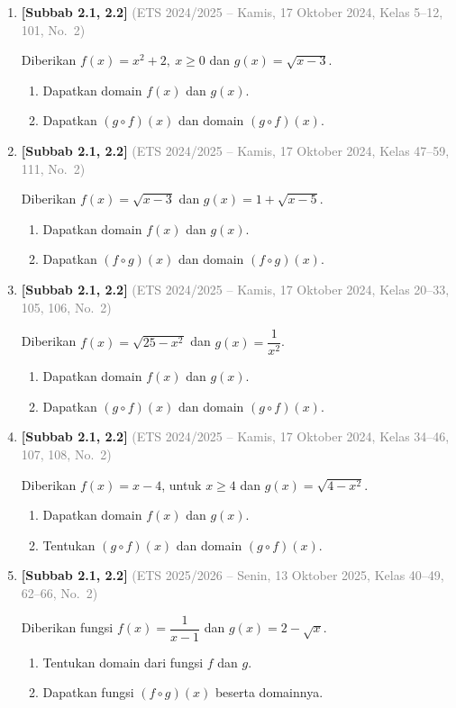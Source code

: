 \documentclass[10pt,openany,a4paper]{article}
\theoremstyle{definition}
\theoremstyle{definition}
\theoremstyle{plain}
\begin{document}
\begin{enumerate}
    \item \textbf{[Subbab 2.1, 2.2]} {\footnotesize\textcolor{gray}{(ETS 2024/2025 -- Kamis, 17 Oktober 2024, Kelas 5--12, 101, No.~2)}}\par
    Diberikan $f(x)=x^2+2,\ x\geq 0$ dan $g(x)=\sqrt{x-3}$.
    \begin{enumerate}
        \item Dapatkan domain $f(x)$ dan $g(x)$.
        \item Dapatkan $(g\circ f)(x)$ dan domain $(g\circ f)(x)$.
    \end{enumerate}

    \item \textbf{[Subbab 2.1, 2.2]} {\footnotesize\textcolor{gray}{(ETS 2024/2025 -- Kamis, 17 Oktober 2024, Kelas 47--59, 111, No.~2)}}\par
    Diberikan $f(x)=\sqrt{x-3}$ dan $g(x)=1+\sqrt{x-5}$.
    \begin{enumerate}
        \item Dapatkan domain $f(x)$ dan $g(x)$.
        \item Dapatkan $(f\circ g)(x)$ dan domain $(f\circ g)(x)$.
    \end{enumerate}

    \item \textbf{[Subbab 2.1, 2.2]} {\footnotesize\textcolor{gray}{(ETS 2024/2025 -- Kamis, 17 Oktober 2024, Kelas 20--33, 105, 106, No.~2)}}\par
    Diberikan $f(x)=\sqrt{25-x^2}$ dan $g(x)=\dfrac{1}{x^2}$.
    \begin{enumerate}
        \item Dapatkan domain $f(x)$ dan $g(x)$.
        \item Dapatkan $(g\circ f)(x)$ dan domain $(g\circ f)(x)$.
    \end{enumerate}

    \item \textbf{[Subbab 2.1, 2.2]} {\footnotesize\textcolor{gray}{(ETS 2024/2025 -- Kamis, 17 Oktober 2024, Kelas 34--46, 107, 108, No.~2)}}\par
    Diberikan $f(x)=x-4$, untuk $x\geq 4$ dan $g(x)=\sqrt{4-x^2}$.
    \begin{enumerate}
        \item Dapatkan domain $f(x)$ dan $g(x)$.
        \item Tentukan $(g\circ f)(x)$ dan domain $(g\circ f)(x)$.
    \end{enumerate}

    \item \textbf{[Subbab 2.1, 2.2]} {\footnotesize\textcolor{gray}{(ETS 2025/2026 -- Senin, 13 Oktober 2025, Kelas 40--49, 62--66, No.~2)}}\par
    Diberikan fungsi $f(x) = \dfrac{1}{x-1}$ dan $g(x) = 2 - \sqrt{x}$.
    \begin{enumerate}
        \item Tentukan domain dari fungsi $f$ dan $g$.
        \item Dapatkan fungsi $(f \circ g)(x)$ beserta domainnya.
    \end{enumerate}


\end{enumerate}
\end{document}
